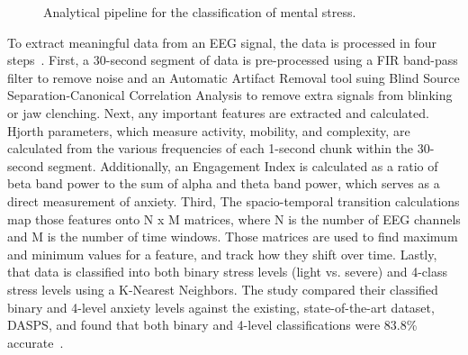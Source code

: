 \documentclass[journal]{IEEEtran}
\begin{document}
\begin{figure}[htbp]
    \centering
    \caption{Analytical pipeline for the classification of mental stress.}
    \label{fig:eeg_pipeline}
\end{figure}

To extract meaningful data from an EEG signal, the data is processed in four steps~\cite[pg.~4]{ChatterjeeDebatri2023Doms}. First, a 30-second segment of data is pre-processed using a FIR band-pass filter to remove noise and an Automatic Artifact Removal tool suing Blind Source Separation-Canonical Correlation Analysis to remove extra signals from blinking or jaw clenching. Next, any important features are extracted and calculated. Hjorth parameters, which measure activity, mobility, and complexity, are calculated from the various frequencies of each 1-second chunk within the 30-second segment. Additionally, an Engagement Index is calculated as a ratio of beta band power to the sum of alpha and theta band power, which serves as a direct measurement of anxiety. Third, The spacio-temporal transition calculations map those features onto N x M matrices, where N is the number of EEG channels and M is the number of time windows. Those matrices are used to find maximum and minimum values for a feature, and track how they shift over time. Lastly, that data is classified into both binary stress levels (light vs. severe) and 4-class stress levels using a K-Nearest Neighbors. The study compared their classified binary and 4-level anxiety levels against the existing, state-of-the-art dataset, DASPS, and found that both binary and 4-level classifications were 83.8\% accurate~\cite[pg.~5]{ChatterjeeDebatri2023Doms}.
\end{document}
